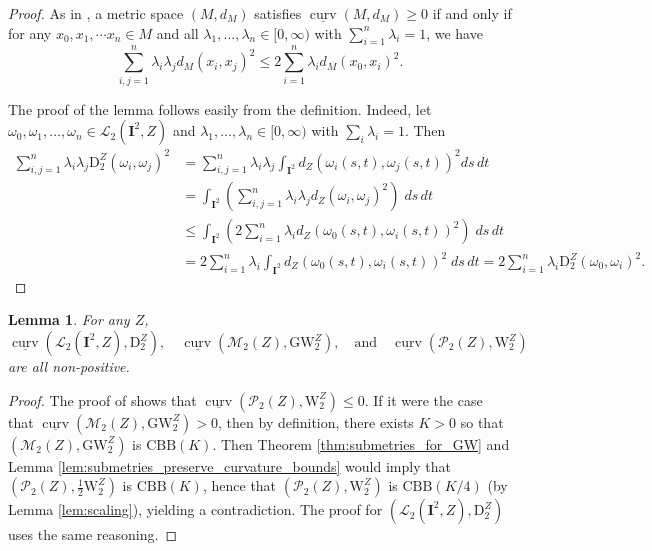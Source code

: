 \documentclass{article}
\newtheorem{lemma}[proposition]{Lemma}
\theoremstyle{definition}
\newcommand{\M}{\mathcal{M}}
\newcommand{\MZ}[1]{\M_{#1}(Z)}
\newcommand{\dgw}[1]{\mathrm{GW}_{#1}^Z}
\newcommand{\WZp}[1]{\mathcal{P}_{#1}(Z)}
\newcommand{\wzp}[1]{\mathrm{W}_{#1}^Z}
\newcommand{\Lpp}[1]{\mathcal{L}_{#1}}
\newcommand{\dz}[1]{\mathrm{D}^Z_{#1}}
\newcommand{\curv}{\underline{\operatorname{curv}}}
\begin{document}
\begin{proof}
    As in \cite{sturm1999metric}, a metric space $(M, d_M)$ satisfies $\curv(M, d_M) \geq 0$ if and only if for any $x_0, x_1,\cdots x_n\in M$ and all $\lambda_1,\ldots, \lambda_n \in [0,\infty)$ with $\sum_{i=1}^n\lambda_i = 1$, we have
\begin{equation}\label{eqn:equivalent_curvature}
        \sum_{i,j=1}^n \lambda_i \lambda_j d_M(x_i, x_j)^2 \leq 2\sum_{i=1}^n \lambda_{i}d_M(x_0, x_i)^2.
    \end{equation}
    
    The proof of the lemma follows easily from the definition.  Indeed, let $\omega_0, \omega_1,\ldots,\omega_n \in \Lpp{2}(\mathbf{I}^2,Z)$ and $\lambda_1,\ldots,\lambda_n \in [0,\infty)$ with $\sum_{i}\lambda_i=1$. Then
    \begin{align}
        \sum_{i,j=1}^n \lambda_i \lambda_j \dz{2}(\omega_i,\omega_j)^2 &= \sum_{i,j=1}^n \lambda_i \lambda_j \int_{\mathbf{I}^2} d_Z(\omega_i(s,t),\omega_j(s,t))^2 ds \, dt \\
        &= \int_{\mathbf{I}^2} \left(\sum_{i,j=1}^n \lambda_i \lambda_j d_Z(\omega_i,\omega_j)^2 \right) \; ds \, dt \\
        &\leq \int_{\mathbf{I}^2} \left(2 \sum_{i=1}^n \lambda_i d_Z(\omega_0(s,t),\omega_i(s,t))^2\right) \; ds \, dt \\
        &= 2 \sum_{i=1}^n \lambda_i \int_{\mathbf{I}^2}   d_Z(\omega_0(s,t),\omega_i(s,t))^2 \; ds \, dt = 2 \sum_{i=1}^n \lambda_i \dz{2}(\omega_0,\omega_i)^2.
    \end{align}
\end{proof}

\begin{lemma}\label{lem:CBB_leq_0}
    For any $Z$, 
    \[
    \curv(\Lpp{2}(\mathbf{I}^2,Z),\dz{2}), \quad  \curv(\MZ{2},  \dgw{2}),  \quad \mbox{and} \quad\curv(\WZp{2},\wzp{2})
    \]
    are all non-positive.
\end{lemma}

\begin{proof}
The proof of \cite[Proposition 2.10 (iv)]{Sturm2006geometryI} shows that $\curv(\WZp{2},\wzp{2}) \leq 0$. If it were the case that $\curv(\MZ{2},  \dgw{2}) > 0$, then by definition, there exists $K>0$ so that $(\MZ{2},\dgw{2})$ is $\mathrm{CBB}(K)$. Then Theorem \ref{thm:submetries_for_GW} and Lemma \ref{lem:submetries_preserve_curvature_bounds} would imply that $(\WZp{2},\frac{1}{2}\wzp{2})$ is $\mathrm{CBB}(K)$, hence that $(\WZp{2},\wzp{2})$ is $\mathrm{CBB}(K/4)$ (by Lemma \ref{lem:scaling}), yielding a contradiction. The proof for $(\Lpp{2}(\mathbf{I}^2,Z),\dz{2})$ uses the same reasoning.
\end{proof}
\end{document}

